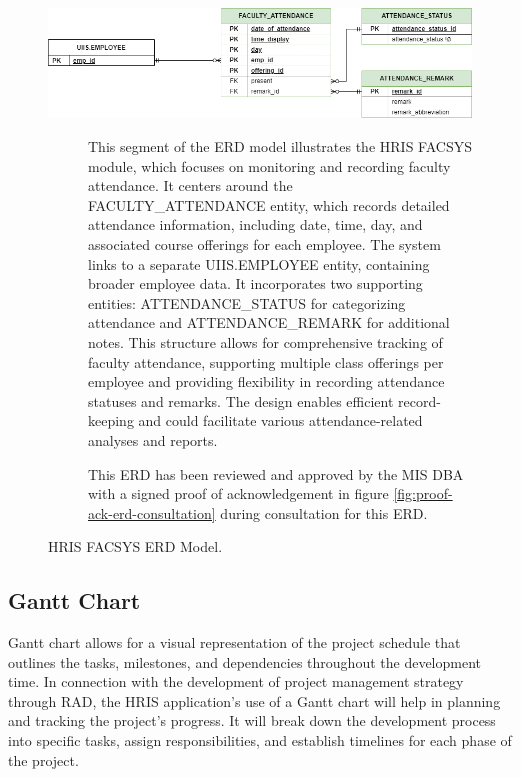     \begin{figure}[H]
        \centering
        \includegraphics[width=1\linewidth]{figures/images/erd-facsys.png}
        \caption{HRIS FACSYS ERD Model.}
        \begin{description}
            \item[] This segment of the ERD model illustrates the HRIS FACSYS module, which focuses on monitoring and recording faculty attendance. It centers around the FACULTY\_ATTENDANCE entity, which records detailed attendance information, including date, time, day, and associated course offerings for each employee. The system links to a separate UIIS.EMPLOYEE entity, containing broader employee data. It incorporates two supporting entities: ATTENDANCE\_STATUS for categorizing attendance and ATTENDANCE\_REMARK for additional notes. This structure allows for comprehensive tracking of faculty attendance, supporting multiple class offerings per employee and providing flexibility in recording attendance statuses and remarks. The design enables efficient record-keeping and could facilitate various attendance-related analyses and reports.
            \item[] This ERD has been reviewed and approved by the MIS DBA with a signed proof of acknowledgement in figure \ref*{fig:proof-ack-erd-consultation} during consultation for this ERD. 
        \end{description}
        \label{fig:erd-facsys}
    \end{figure}
    
    \subsection{Gantt Chart}
    
    Gantt chart allows for a visual representation of the project schedule that outlines the tasks, milestones, and dependencies throughout the development time. In connection with the development of project management strategy through RAD, the HRIS application's use of a Gantt chart will help in planning and tracking the project's progress. It will break down the development process into specific tasks, assign responsibilities, and establish timelines for each phase of the project.
    
